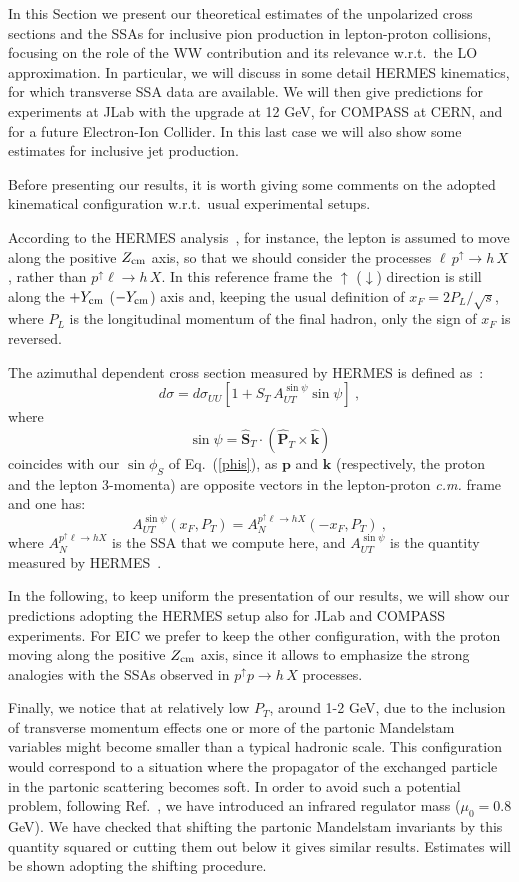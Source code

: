 \documentclass[nofootinbib,superscriptaddress,aps]{revtex4}
\newcommand{\be}{\begin{equation}}
\newcommand{\ee}{\end{equation}}
\newcommand{\pup}{p^\uparrow}
\begin{document}
In this Section we present our theoretical estimates of the unpolarized cross sections and the SSAs for inclusive pion production in lepton-proton collisions, focusing on the role of the WW contribution and its relevance w.r.t.~the LO approximation.
In particular, we will discuss in some detail HERMES kinematics, for which transverse SSA data are available. We will then give predictions for experiments at JLab with the upgrade at 12 GeV, for COMPASS at CERN, and for a future Electron-Ion Collider. In this last case we will also show some estimates for inclusive jet production.

Before presenting our results, it is worth giving some comments on the adopted kinematical configuration w.r.t.~usual experimental setups.

According to the HERMES analysis~\cite{Airapetian:2013bim}, for instance, the lepton is assumed to move along the positive $Z_{\rm cm}$ axis, so that we should consider the processes $\ell \, \pup \to h \, X$, rather than $\pup \ell \to h \, X$. In this reference frame the $\uparrow$ ($\downarrow$) direction is still along the $+Y_{\rm cm}$ ($-Y_{\rm cm}$) axis and, keeping the usual definition of $x_F = 2 P_L/\sqrt s$, where $P_L$ is the longitudinal momentum of the final hadron, only the sign of $x_F$ is reversed.

The azimuthal dependent cross section measured by HERMES is defined as~\cite{Airapetian:2013bim}:
%
\be
d\sigma = d\sigma_{UU}[1+S_T \, A_{UT}^{\sin\psi} \sin\psi] \>,
\label{sigH}
\ee
%
where
\be
\sin \psi = \hat{\bm{S}}_T \cdot (\hat{\bm{P}}_T \times \hat{\bm{k}})
\ee
%
coincides with our $\sin\phi_S$ of Eq.~(\ref{phis}), as $\bm{p}$ and $\bm{k}$ (respectively, the proton and the lepton 3-momenta) are opposite vectors
in the lepton-proton {\it c.m.} frame and one has:
%
\be
A_{UT}^{\sin\psi}(x_F, P_T) = A_N^{p^\uparrow \ell \to h X}(-x_F, P_T)  \>,
\label{AUT-hermes}
\ee
%
where $A_N^{p^\uparrow \ell \to h X}$ is the SSA that we compute here, and $A_{UT}^{\sin\psi}$ is the quantity measured by HERMES~\cite{Airapetian:2013bim}.


In the following, to keep uniform the presentation of our results, we will show our predictions adopting the HERMES setup also for JLab and COMPASS experiments. For EIC we prefer to keep the other configuration, with the proton moving along the positive $Z_{\rm cm}$ axis, since it allows to emphasize the strong analogies with the SSAs observed in $p^\uparrow p\to h\,X$ processes.

Finally, we notice that at relatively low $P_T$, around 1-2 GeV, due to the inclusion of transverse momentum effects one or more of the partonic Mandelstam variables might become smaller than a typical hadronic scale. This configuration would correspond to a situation where the propagator of the exchanged particle in the partonic scattering becomes soft. In order to avoid such a potential problem, following Ref.~\cite{DAlesio:2004eso}, we have introduced an infrared regulator mass ($\mu_0 =0.8$ GeV). We have checked that shifting the partonic Mandelstam invariants by this quantity squared or cutting them out below it gives similar results. Estimates will be shown adopting the shifting procedure.
\end{document}

